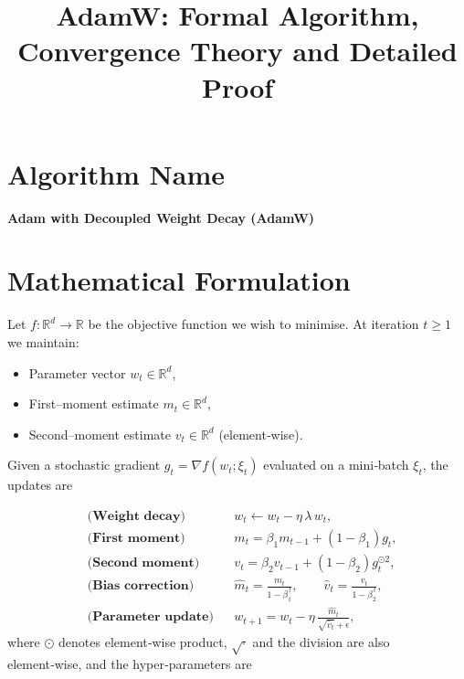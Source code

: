 \documentclass{article}
\newcommand{\R}{\mathbb{R}}
\begin{document}
\title{AdamW: Formal Algorithm, Convergence Theory and Detailed Proof}
\author{}
\date{}
\maketitle

\tableofcontents

\section*{Algorithm Name}
\begin{center}
\Large \textbf{Adam with Decoupled Weight Decay (AdamW)}
\end{center}
\section{Mathematical Formulation}
\label{sec:formulation}
Let $f:\R^d\rightarrow\R$ be the objective function we wish to minimise.  
At iteration $t\ge 1$ we maintain:

\begin{itemize}
    \item Parameter vector $w_t\in\R^d$,
    \item First–moment estimate $m_t\in\R^d$,
    \item Second–moment estimate $v_t\in\R^d$ (element‑wise).
\end{itemize}
Given a stochastic gradient $g_t=\nabla f(w_t;\xi_t)$ evaluated on a mini‑batch $\xi_t$, the updates are

\begin{align}
    &\textbf{(Weight decay)} && w_t \leftarrow w_t - \eta \,\lambda\, w_t , \label{eq:wd}\\[4pt]
    &\textbf{(First moment)} && m_t = \beta_1 m_{t-1} + (1-\beta_1) g_t , \label{eq:m}\\[4pt]
    &\textbf{(Second moment)} && v_t = \beta_2 v_{t-1} + (1-\beta_2) g_t^{\odot 2} , \label{eq:v}\\[4pt]
    &\textbf{(Bias correction)} &&
    \hat m_t = \frac{m_t}{1-\beta_1^{\,t}},\qquad 
    \hat v_t = \frac{v_t}{1-\beta_2^{\,t}} , \label{eq:bc}\\[4pt]
    &\textbf{(Parameter update)} &&
    w_{t+1}= w_t - \eta \, \frac{\hat m_t}{\sqrt{\hat v_t}+\epsilon}, \label{eq:update}
\end{align}
where $\odot$ denotes element‑wise product, $\sqrt{\cdot}$ and the division are also element‑wise, and the hyper‑parameters are
\end{document}
